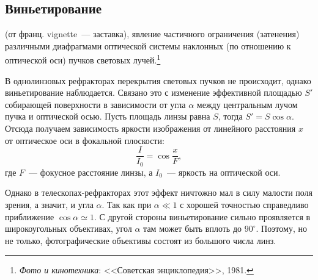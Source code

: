 \subsection{Виньетирование}
 (от франц. vignette~--- заставка), явление частичного ограничения (затенения) различными диафрагмами оптической системы наклонных (по отношению к оптической оси) пучков световых лучей.\footnote{{\itshape Фото и кинотехника}: <<Советская энциклопедия>>, 1981.}

В однолинзовых рефракторах перекрытия световых пучков не происходит, однако виньетирование наблюдается. Связано это с изменение эффективной площадью $S'$ собирающей поверхности в зависимости от угла $\alpha$ между центральным лучом пучка и оптической осью. Пусть площадь линзы равна $S$, тогда $S' = S\cos \alpha$. Отсюда получаем зависимость яркости изображения от линейного расстояния $x$ от оптическое оси в фокальной плоскости:
\begin{equation*}
	\frac{I}{I_0} = \cos \frac{x}{F},
\end{equation*}
где $F$~---  фокусное расстояние линзы, а $I_0$~--- яркость на оптической оси.

Однако в телескопах-рефракторах этот эффект ничтожно мал в силу малости поля зрения, а значит, и угла $\alpha$. Так как при $\alpha \ll 1$ с хорошей точностью справедливо приближение $\cos \alpha \simeq 1$. С другой стороны виньетирование сильно проявляется в широкоугольных объективах, угол $\alpha$ там может быть вплоть до $90^\circ$. Поэтому, но не только, фотографические объективы состоят из большого числа линз.

